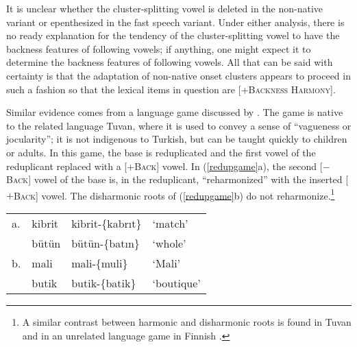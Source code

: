 \noindent
It is unclear whether the cluster-splitting vowel is deleted in the non-native variant or epenthesized in the fast speech variant. 
    Under either analysis, there is no ready explanation for the tendency of the cluster-splitting vowel to have the backness features of following vowels; if anything, one might expect it to determine the backness features of following vowels. 
    All that can be said with certainty is that the adaptation of non-native onset clusters appears to proceed in such a fashion so that the lexical items in question are [$+$\textsc{Backness Harmony}].

Similar evidence comes from a language game discussed by \citet{Harrison2001}. 
    The game is native to the related language Tuvan, where it is used to convey a sense of ``vagueness or jocularity''; it is not indigenous to Turkish, but can be taught quickly to children or adults. 
    In this game, the base is reduplicated and the first vowel of the reduplicant replaced with a [$+$\textsc{Back}] vowel. 
    In (\ref{redupgame}a), the second [$-$\textsc{Back}] vowel of the base is, in the reduplicant, ``reharmonized'' with the inserted [$+$\textsc{Back}] vowel. 
    The disharmonic roots of (\ref{redupgame}b) do not reharmonize.\footnote{
    A similar contrast between harmonic and disharmonic roots is found in Tuvan \citep{Harrison2001} and in an unrelated language game in Finnish \citep{Campbell1986}.}

\begin{example} 
\label{redupgame}
\begin{tabular}{llll}
a. & {kibrit} & {kibrit}-\{{kabrıt}\} & `match'    \\
   & {bütün}  & {bütün}-\{{batın}\}   & `whole'    \\
b. & {mali}   & {mali}-\{{muli}\}     & `Mali'     \\
   & {butik}  & {butik}-\{{batik}\}   & `boutique' \\
\end{tabular}
\end{example}

